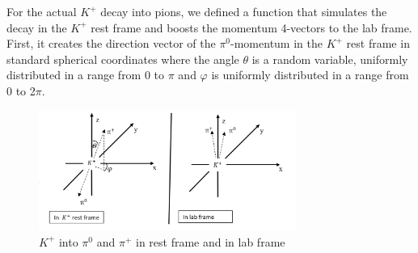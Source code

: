 \documentclass[a4paper,parskip,11pt, DIV12]{scrreprt}
\begin{document}
	For the actual $K^+$ decay into pions, we defined a function that simulates the decay in the $K^+$ rest frame and boosts the momentum 4-vectors to the lab frame.
	First, it creates the direction vector of the $\pi^0$-momentum in the $K^+$ rest frame in standard spherical coordinates where the angle $\theta$ is a random variable, uniformly distributed in a range from 0 to $\pi$ and $\varphi$ is uniformly distributed in a range from 0 to 2$\pi$. 
	\begin{figure}[H] 
		\centering
		\includegraphics[width=0.75\textwidth]{Frames.png} 
		\caption{$K^+$ into $\pi^0$ and $\pi^+$ in rest frame and in lab frame}
		\label{fig:2}    
	\end{figure}
\end{document}
